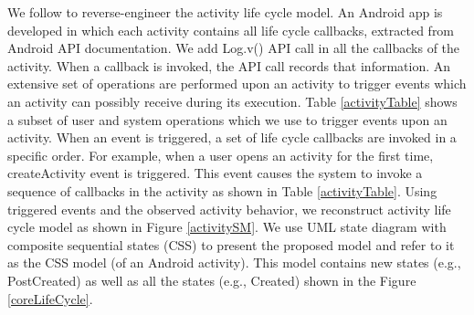 \documentclass[10pt]{elsarticle}
\begin{document}
We follow \cite{Franke2011} to reverse-engineer the activity life cycle model. An Android app is developed in which each activity contains all life cycle callbacks, extracted from Android API documentation. We add {\ttfamily Log.v()} API call in all the callbacks of the activity. When a callback is invoked, the API call records that information. An extensive set of operations are performed upon an activity to trigger events which an activity can possibly receive during its execution. Table \ref{activityTable} shows a subset of user and system operations which we use to trigger events upon an activity. When an event is triggered, a set of life cycle callbacks are invoked in a specific order. For example, when a user opens an activity for the first time, createActivity event is triggered. This event causes the system to invoke a sequence of callbacks in the activity as shown in Table \ref{activityTable}. Using triggered events and the observed activity behavior, we reconstruct activity life cycle model as shown in Figure \ref{activitySM}. We use UML state diagram with composite sequential states (CSS) \cite{BoochUML} to present the proposed model and refer to it as the CSS model (of an Android activity). This model contains new states (e.g., PostCreated) as well as all the states (e.g., Created) shown in the Figure \ref{coreLifeCycle}. 
\end{document}
